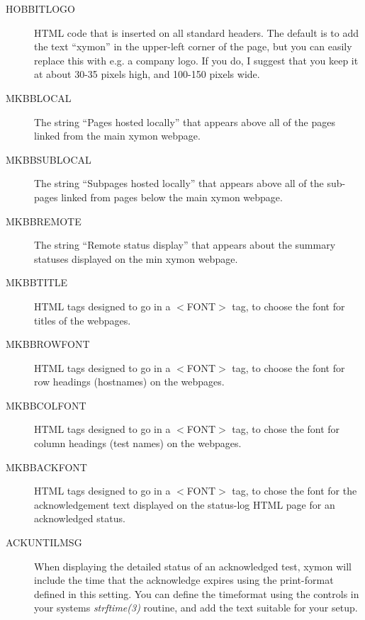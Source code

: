  \begin{description}
\item[HOBBITLOGO] HTML code that is inserted on all standard headers. The default is to add the text ``xymon'' in the upper-left corner of the page, but you can easily replace this with e.g. a company logo. If you do, I suggest that you keep it at about 30-35 pixels high, and 100-150 pixels wide. 

 

\item[MKBBLOCAL] The string ``Pages hosted locally'' that appears above all of the pages linked from the main xymon webpage. 

 

\item[MKBBSUBLOCAL] The string ``Subpages hosted locally'' that appears above all of the sub-pages linked from pages below the main xymon webpage. 

 

\item[MKBBREMOTE] The string ``Remote status display'' that appears about the summary statuses displayed on the min xymon webpage. 

 

\item[MKBBTITLE] HTML tags designed to go in a $<$FONT$>$ tag, to choose the font for titles of the webpages. 

 

\item[MKBBROWFONT] HTML tags designed to go in a $<$FONT$>$ tag, to choose the font for row headings (hostnames) on the webpages. 

 

\item[MKBBCOLFONT] HTML tags designed to go in a $<$FONT$>$ tag, to chose the font for column headings (test names) on the webpages. 

 

\item[MKBBACKFONT] HTML tags designed to go in a $<$FONT$>$ tag, to chose the font for the acknowledgement text displayed on the status-log HTML page for an acknowledged status. 

 

\item[ACKUNTILMSG] When displaying the detailed status of an acknowledged test, xymon will include the time that the acknowledge expires using the print-format defined in this setting. You can define the timeformat using the controls in your systems \emph{strftime(3)}
 routine, and add the text suitable for your setup. 


\end{description}
